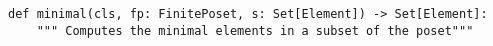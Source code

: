 \begin{verbatim}
def minimal(cls, fp: FinitePoset, s: Set[Element]) -> Set[Element]:
    """ Computes the minimal elements in a subset of the poset"""
\end{verbatim}